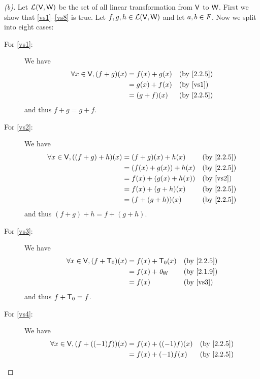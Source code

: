 \begin{proof}[(b)]
	Let \(\mathcal{L}(\mathsf{V}, \mathsf{W})\) be the set of all linear transformation from \(\mathsf{V}\) to \(\mathsf{W}\).
	First we show that \ref{vs1}--\ref{vs8} is true.
	Let \(f, g, h \in \mathcal{L}(\mathsf{V}, \mathsf{W})\) and let \(a, b \in \mathit{F}\).
	Now we split into eight cases:
	\begin{description}
		\item[For \ref{vs1}:] We have
			\begin{align*}
				\forall x \in \V, (f + g)(x) & = f(x) + g(x) &  & \by{2.2.5}            \\
				                             & = g(x) + f(x) &  & \text{(by \ref{vs1})} \\
				                             & = (g + f)(x)  &  & \by{2.2.5}
			\end{align*}
			and thus \(f + g = g + f\).
		\item[For \ref{vs2}:] We have
			\begin{align*}
				\forall x \in \V, ((f + g) + h)(x) & = (f + g)(x) + h(x)    &  & \by{2.2.5}            \\
				                                   & = (f(x) + g(x)) + h(x) &  & \by{2.2.5}            \\
				                                   & = f(x) + (g(x) + h(x)) &  & \text{(by \ref{vs2})} \\
				                                   & = f(x) + (g + h)(x)    &  & \by{2.2.5}            \\
				                                   & = (f + (g + h))(x)     &  & \by{2.2.5}
			\end{align*}
			and thus \((f + g) + h = f + (g + h)\).
		\item[For \ref{vs3}:] We have
			\begin{align*}
				\forall x \in \V, (f + \zT)(x) & = f(x) + \zT(x)   &  & \by{2.2.5}            \\
				                               & = f(x) + \zv_{\W} &  & \by{2.1.9}            \\
				                               & = f(x)            &  & \text{(by \ref{vs3})}
			\end{align*}
			and thus \(f + \mathsf{T}_0 = f\).
		\item[For \ref{vs4}:] We have
			\begin{align*}
				\forall x \in \V, (f + ((-1)f))(x) & = f(x) + ((-1)f)(x) &  & \by{2.2.5}            \\
				                                   & = f(x) + (-1)f(x)   &  & \by{2.2.5}            \\

\end{align*}
\end{description}
\end{proof}
